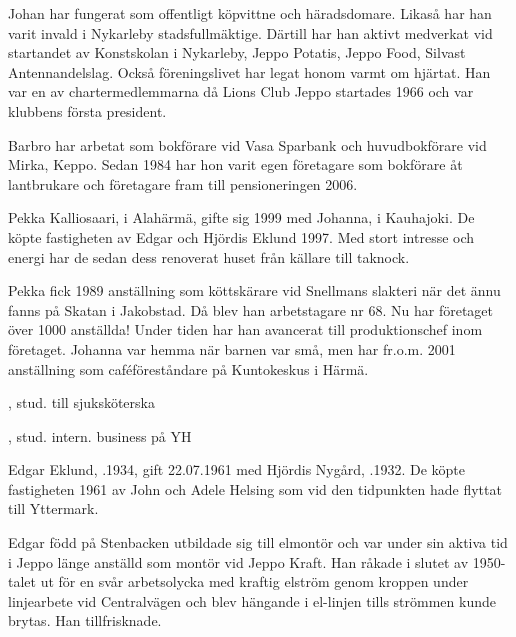 Johan har fungerat som offentligt köpvittne och häradsdomare.	Likaså har han varit invald i Nykarleby stadsfullmäktige. Därtill har	han aktivt medverkat vid startandet av Konstskolan i Nykarleby,	Jeppo Potatis, Jeppo Food, Silvast Antennandelslag. Också föreningslivet har legat honom varmt om hjärtat. Han var en av chartermedlemmarna då Lions Club Jeppo startades 1966 och var klubbens första president.

Barbro har arbetat som bokförare vid Vasa Sparbank och huvudbokförare vid Mirka, Keppo. Sedan 1984 har hon varit egen företagare som bokförare åt lantbrukare och företagare fram till pensioneringen 2006.






Pekka Kalliosaari,  i Alahärmä, gifte sig 1999 med Johanna,  i Kauhajoki. De köpte fastigheten av Edgar och Hjördis Eklund 1997. Med stort intresse och energi har de sedan dess renoverat huset från källare till taknock.

Pekka fick 1989 anställning som köttskärare vid Snellmans slakteri när det ännu fanns på Skatan i Jakobstad. Då blev han arbetstagare nr 68. Nu har företaget över 1000 anställda! Under tiden har han avancerat till produktionschef inom företaget. Johanna var hemma när barnen var små, men har fr.o.m. 2001	anställning som caféföreståndare på Kuntokeskus i Härmä.
\begin{jhchildren}
  \item {}, stud. till sjuksköterska
  \item {}, stud. intern. business på YH
  \item {}
\end{jhchildren}


Edgar Eklund, .1934, gift 22.07.1961 med Hjördis Nygård, .1932. De köpte fastigheten 1961 av John och Adele Helsing som vid den tidpunkten hade flyttat till Yttermark.

Edgar född på Stenbacken utbildade sig till elmontör och var under sin aktiva tid i Jeppo länge anställd som montör vid Jeppo	Kraft. Han 	råkade i slutet av 1950-talet ut för en svår arbetsolycka med kraftig elström genom kroppen under linjearbete vid Centralvägen och blev 	hängande i el-linjen tills strömmen kunde brytas. Han tillfrisknade.

